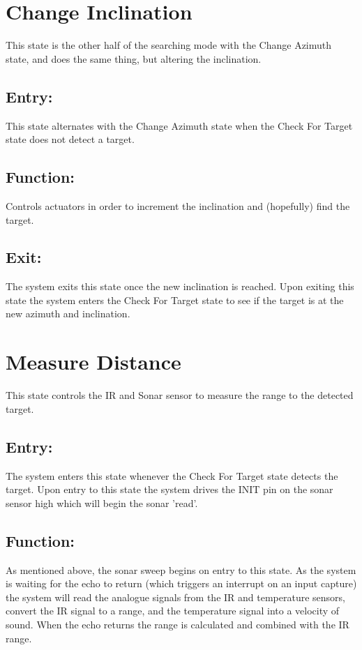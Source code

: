 \documentclass[]{article}
\begin{document}
\section{Change Inclination}
This state is the other half of the searching mode with the Change Azimuth state, and does the same thing, but altering the inclination.

\subsection{Entry:}
This state alternates with the Change Azimuth state when the Check For Target state does not detect a target.

\subsection{Function:}
Controls actuators in order to increment the inclination and (hopefully) find the target.

\subsection{Exit:}
The system exits this state once the new inclination is reached. Upon exiting this state the system enters the Check For Target state to see if the target is at the new azimuth and inclination.

\section{Measure Distance}
This state controls the IR and Sonar sensor to measure the range to the detected target.

\subsection{Entry:}
The system enters this state whenever the Check For Target state detects the target. Upon entry to this state the system drives the INIT pin on the sonar sensor high which will begin the sonar 'read'.

\subsection{Function:}
As mentioned above, the sonar sweep begins on entry to this state. As the system is waiting for the echo to return (which triggers an interrupt on an input capture) the system will read the analogue signals from the IR and temperature sensors, convert the IR signal to a range, and the temperature signal into a velocity of sound. When the echo returns the range is calculated and combined with the IR range.
\end{document}
